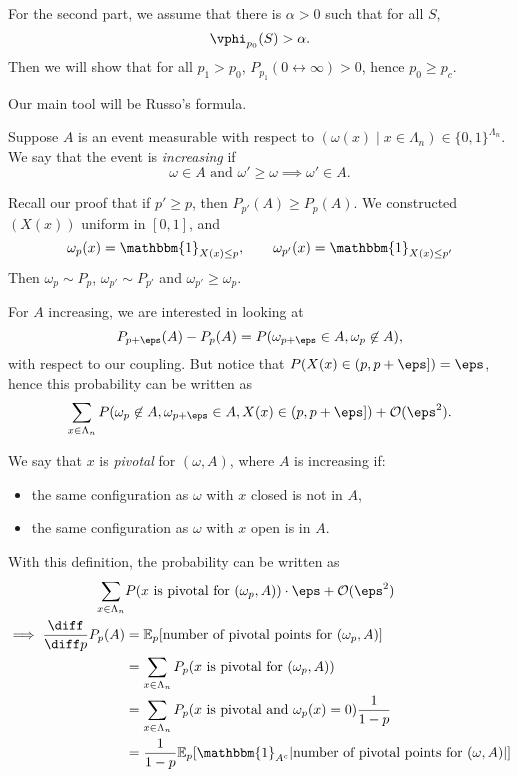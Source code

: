 \documentclass[12pt]{article}
\begin{document}
For the second part, we assume that there is $\alpha > 0$ such that for all $S$,
\[
	\vphi_{p_0}(S) > \alpha.
\]
Then we will show that for all $p_1 > p_0$, $P_{p_1}(0 \leftrightarrow \infty) > 0$, hence $p_0 \geq p_c$.

Our main tool will be Russo's formula.

\begin{definition}
	Suppose $A$ is an event measurable with respect to $(\omega(x) \mid x \in \Lambda_n) \in \{0, 1\}^{\Lambda_n}$. We say that the event is \emph{increasing} if
	\[
		\omega \in A \text{ and } \omega' \geq \omega \implies \omega' \in A.
	\]
\end{definition}

\begin{exbox}
	Recall our proof that if $p' \geq p$, then $P_{p'}(A) \geq P_{p}(A)$. We constructed $(X(x))$ uniform in $[0, 1]$, and
	\[
	\omega_{p}(x) = \mathbbm{1}_{X(x) \leq p}, \qquad \omega_{p'}(x) = \mathbbm{1}_{X(x) \leq p'}
	\]
	Then $\omega_p \sim P_p$, $\omega_{p'} \sim P_{p'}$ and $\omega_{p'} \geq \omega_p$.
\end{exbox}

For $A$ increasing, we are interested in looking at
\[
P_{p + \eps}(A) - P_p(A) = P(\omega_{p + \eps} \in A, \omega_p \not \in A),
\]
with respect to our coupling. But notice that $P(X(x) \in (p, p + \eps]) = \eps$, hence this probability can be written as
\[
	\sum_{x \in \Lambda_n} P(\omega_p \not \in A, \omega_{p+\eps} \in A, X(x) \in (p, p + \eps]) + \mathcal{O}(\eps^2).
\]
\begin{definition}
	We say that $x$ is \emph{pivotal} for $(\omega, A)$, where $A$ is increasing if:
	\begin{itemize}
		\item the same configuration as $\omega$ with $x$ closed is not in $A$,
		\item the same configuration as $\omega$ with $x$ open is in $A$.
	\end{itemize}
\end{definition}
With this definition, the probability can be written as
\begin{align*}
	\sum_{x \in \Lambda_n} &P(x \text{ is pivotal for } (\omega_p, A)) \cdot \eps + \mathcal{O}(\eps^2) \\
	\implies \frac{\diff}{\diff p} P_p(A) &= \mathbb{E}_p[\text{number of pivotal points for } (\omega_p, A)] \\
					      &= \sum_{x \in \Lambda_n} P_p(x \text{ is pivotal for } (\omega_p, A)) \\
					      &= \sum_{x \in \Lambda_n} P_p(x \text{ is pivotal and } \omega_p(x) = 0) \frac{1}{1 - p} \\
					      &= \frac{1}{1 - p} \mathbb{E}_p[\mathbbm{1}_{A^{c}} |\text{number of pivotal points for $(\omega, A)$}|]
\end{align*}
\end{document}
